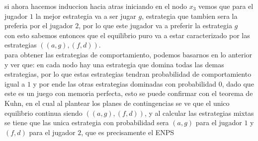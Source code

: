 \documentclass[11pt]{article}
\begin{document}
\begin{flushleft}
    si ahora hacemos induccion hacia atras iniciando en el nodo $x_3$ vemos que para el jugador $1$ la mejor
    estrategia va a ser jugar $g$, estrategia que tambien sera la preferia por el jugador $2$, por lo que este jugador va a preferir la estrategia $g$\\
    con esto sabemos entonces que el equilibrio puro va a estar caracterizado por las estrategias $((a,g),(f,d))$.\\
    para obtener las estrategias de comportamiento, podemos basarnos en lo anterior y ver que: 
    en cada nodo hay una estrategia que domina todas las demas estrategias, por lo que estas estrategias tendran probabilidad de comportamiento igual a $1$ y por ende
    las otras estrategias dominadas con probabilidad $0$, dado que este es un juego con memoria perfecta, esto se puede confirmar con el teorema de Kuhn, en el cual al
    plantear los planes de contingencias se ve que el unico equilibrio continua siendo $((a,g),(f,d))$, y al calcular las estrategias mixtas se tiene que las unica estrategia
    con probabilidad sera $(a,g)$ para el jugador $1$ y $(f,d)$ para el jugador $2$, que es precisamente el ENPS
\end{flushleft}

 
\end{document}
